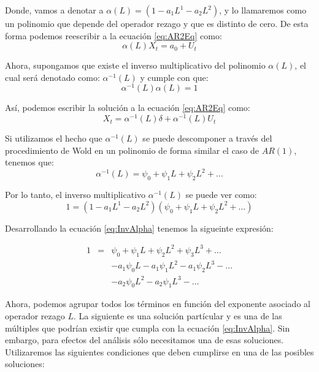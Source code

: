 \documentclass[
]{book}
\begin{document}
Donde, vamos a denotar a \(\alpha (L) = (1 - a_1 L^1 - a_2 L^2)\), y lo llamaremos como un polinomio que depende del operador rezago y que es distinto de cero. De esta forma podemos reescribir a la ecuación \eqref{eq:AR2Eq} como:
\begin{equation}
    \alpha(L) X_t = a_0 + U_t
\end{equation}

Ahora, supongamos que existe el inverso multiplicativo del polinomio \(\alpha(L)\), el cual será denotado como: \(\alpha^{-1}(L)\) y cumple con que:
\begin{equation}
    \alpha^{-1}(L) \alpha(L) = 1    
\end{equation}

Así, podemos escribir la solución a la ecuación \eqref{eq:AR2Eq} como:
\begin{equation*}
    X_t = \alpha^{-1}(L) \delta + \alpha^{-1}(L) U_t
\end{equation*}

Si utilizamos el hecho que \(\alpha^{-1}(L)\) se puede descomponer a través del procedimiento de Wold en un polinomio de forma similar el caso de \(AR(1)\), tenemos que:
\begin{equation}
    \alpha^{-1}(L) = \psi_0 + \psi_1 L + \psi_2 L^2 + \ldots
\end{equation}

Por lo tanto, el inverso multiplicativo \(\alpha^{-1}(L)\) se puede ver como:
\begin{equation}
    1 = (1 - a_1 L^1 - a_2 L^2) (\psi_0 + \psi_1 L + \psi_2 L^2 + \ldots)
    \label{eq:InvAlpha}
\end{equation}

Desarrollando la ecuación \eqref{eq:InvAlpha} tenemos la sigueinte expresión:

\begin{eqnarray*}
  1 & = & \psi_0 + \psi_1 L + \psi_2 L^2 + \psi_3 L^3 + \ldots \\
  &  &  - a_1 \psi_0 L - a_1 \psi_1 L^2 - a_1 \psi_2 L^3 - \ldots \\
  &  &  - a_2 \psi_0 L^2 - a_2 \psi_1 L^3 - \ldots
\end{eqnarray*}

Ahora, podemos agrupar todos los términos en función del exponente asociado al operador rezago \(L\). La siguiente es una solución partícular y es una de las múltiples que podrían existir que cumpla con la ecuación \eqref{eq:InvAlpha}. Sin embargo, para efectos del análisis sólo necesitamos una de esas soluciones. Utilizaremos las siguientes condiciones que deben cumplirse en una de las posibles soluciones:
\end{document}
